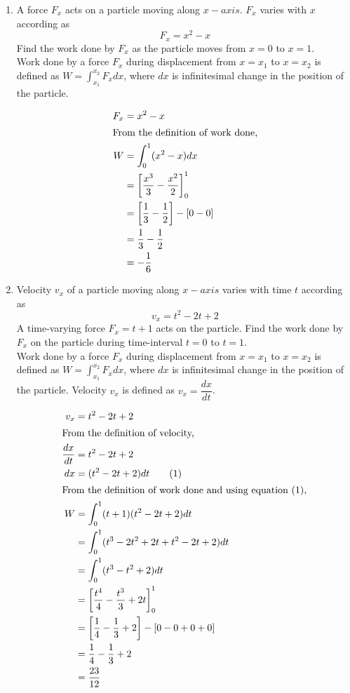 \begin{enumerate}
    \item A force $F_x$ acts on a particle moving along $x-axis$. $F_x$ varies with $x$ according as \[F_x=x^2-x\]
        Find the work done by $F_x$ as the particle moves from $x=0$ to $x=1$.\\[2mm]
        Work done by a force $F_x$ during displacement from $x=x_1$ to $x=x_2$ is defined as $W=\int_{x_1}^{x_2} F_xdx$, where $dx$ is infinitesimal change in the position of the particle.
        \begin{solution}
            \begin{align*}
                F_x &= x^2 - x\\
                \intertext{From the definition of work done,}
                W &= \int_{0}^{1} (x^2 - x)dx\\
                &= \left[\frac{x^3}{3} - \frac{x^2}{2}\right]_{0}^{1}\\
                &= \left[\frac{1}{3} - \frac{1}{2}\right] - \left[0 - 0\right]\\
                &= \frac{1}{3} - \frac{1}{2}\\
                &= -\frac{1}{6}
            \end{align*}
        \end{solution}

        \BgThispage
    \item Velocity $v_x$ of a particle moving along $x-axis$ varies with time $t$ according as \[v_x=t^2-2t+2\]
    A time-varying force $F_x=t+1$ acts on the particle.
    Find the work done by $F_x$ on the particle during time-interval $t=0$ to $t=1$.\\[2mm]
    Work done by a force $F_x$ during displacement from $x=x_1$ to $x=x_2$ is defined as $W=\int_{x_1}^{x_2} F_xdx$, where $dx$ is infinitesimal change in the position of the particle. Velocity $v_x$ is defined as $v_x=\dfrac{dx}{dt}$.
    \begin{solution}
        \begin{align*}
            v_x &= t^2 - 2t + 2\\
            \intertext{From the definition of velocity,}
            \frac{dx}{dt} &= t^2 - 2t + 2\\
            dx &= (t^2 - 2t + 2)dt \tag{1}\\
            \intertext{From the definition of work done and using equation (1),}
            W &= \int_{0}^{1} (t+1)(t^2 - 2t + 2)dt\\
            &= \int_{0}^{1} (t^3 - 2t^2 + 2t + t^2 - 2t + 2)dt\\
            &= \int_{0}^{1} (t^3 - t^2  + 2)dt\\
            &= \left[\frac{t^4}{4} - \frac{t^3}{3} + 2t\right]_{0}^{1}\\
            &= \left[\frac{1}{4} - \frac{1}{3} + 2\right] - \left[0 - 0 + 0 + 0\right]\\
            &= \frac{1}{4} - \frac{1}{3} + 2\\
            &= \frac{23}{12}
        \end{align*}
    \end{solution}


\end{enumerate}
